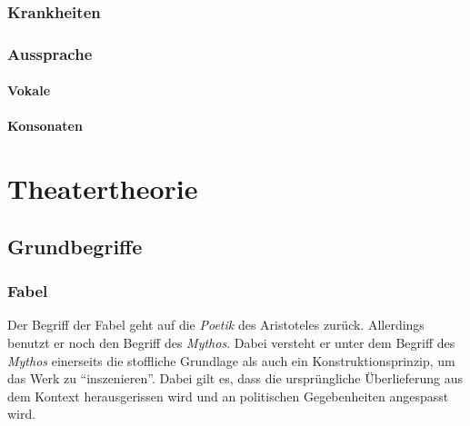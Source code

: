 \documentclass[ngerman, a4paper, twoside]{scrbook}%
\begin{document}
	\section{Krankheiten}
	\section{Aussprache}%
	\subsection{Vokale}
	\subsection{Konsonaten}


	\setcounter{chapter}{0}
	\setcounter{section}{0}
	\part{Theatertheorie}

	\chapter{Grundbegriffe}

	\section{Fabel}
	Der Begriff der Fabel geht auf die \emph{Poetik} des Aristoteles zurück. Allerdings benutzt er noch den Begriff des \emph{Mythos}. Dabei versteht er unter dem Begriff des \emph{Mythos} einerseits die stoffliche Grundlage als auch ein Konstruktionsprinzip, um das Werk zu "`inszenieren"'. Dabei gilt es, dass die ursprüngliche Überlieferung aus dem Kontext herausgerissen wird und an politischen Gegebenheiten angespasst wird. \\
\end{document}

